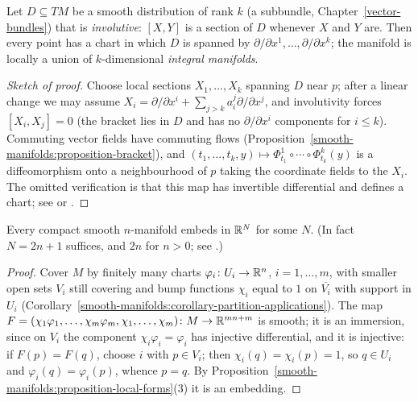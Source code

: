 \begin{theorem}[Frobenius]\label{smooth-manifolds:theorem-frobenius}
Let $D \subseteq TM$ be a smooth distribution of rank $k$ (a subbundle, Chapter~\ref{vector-bundles}) that is \emph{involutive}: $[X, Y]$ is a section of $D$ whenever $X$ and $Y$ are. Then every point has a
chart in which $D$ is spanned by $\partial/\partial x^1, \ldots, \partial/\partial x^k$; the manifold is locally a union of $k$-dimensional \emph{integral manifolds}.
\end{theorem}

\begin{proof}[Sketch of proof]
Choose local sections $X_1, \ldots, X_k$ spanning $D$ near $p$; after a linear change we may assume $X_i = \partial/\partial x^i + \sum_{j > k}a^j_i\partial/\partial x^j$, and involutivity forces $[X_i, X_j] = 0$ (the
bracket lies in $D$ and has no $\partial/\partial x^i$ components for $i \leq k$). Commuting vector fields have commuting flows (Proposition~\ref{smooth-manifolds:proposition-bracket}), and
$(t_1, \ldots, t_k, y) \mapsto \Phi^1_{t_1} \circ \cdots \circ \Phi^k_{t_k}(y)$ is a diffeomorphism onto a neighbourhood of $p$ taking the coordinate fields to the $X_i$. The omitted verification is that
this map has invertible differential and defines a chart; see \cite[Chapter 19]{lee-smooth-manifolds} or \cite[Chapter 1]{warner-foundations}.
\end{proof}

\begin{theorem}\label{smooth-manifolds:theorem-whitney}
Every compact smooth $n$-manifold embeds in $\mathbb{R}^N$ for some $N$. (In fact $N = 2n + 1$ suffices, and $2n$ for $n > 0$; see \cite[Chapter 1]{hirsch-differential-topology}.)
\end{theorem}

\begin{proof}
Cover $M$ by finitely many charts $\varphi_i \colon U_i \to \mathbb{R}^n$, $i = 1, \ldots, m$, with smaller open sets $V_i$ still covering and bump functions $\chi_i$ equal to $1$ on $\overline{V_i}$ with support in $U_i$
(Corollary~\ref{smooth-manifolds:corollary-partition-applications}). The map $F = (\chi_1\varphi_1, \ldots, \chi_m\varphi_m, \chi_1, \ldots, \chi_m) \colon M \to \mathbb{R}^{mn + m}$ is smooth; it is an immersion,
since on $V_i$ the component $\chi_i\varphi_i = \varphi_i$ has injective differential, and it is injective: if $F(p) = F(q)$, choose $i$ with $p \in V_i$; then $\chi_i(q) = \chi_i(p) = 1$, so $q \in U_i$ and
$\varphi_i(q) = \varphi_i(p)$, whence $p = q$. By Proposition~\ref{smooth-manifolds:proposition-local-forms}(3) it is an embedding.
\end{proof}

